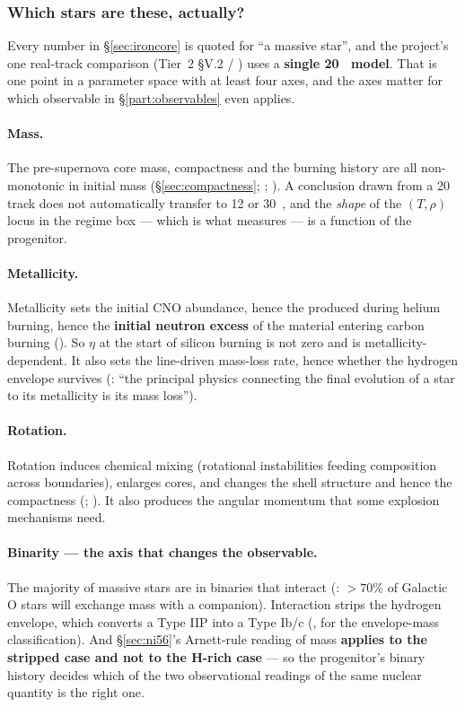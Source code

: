 \subsubsection{Which stars are these, actually?}
\label{sec:whichstars}

Every number in \S\ref{sec:ironcore} is quoted for ``a massive star'', and the
project's one real-track comparison (Tier~2 \S V.2 / ) uses
a \textbf{single 20~\Msun{} model}. That is one point in a parameter space with
at least four axes, and the axes matter for which observable in
\S\ref{part:observables} even applies.

\paragraph{Mass.} The pre-supernova core mass, compactness and the burning
history are all non-monotonic in initial mass (\S\ref{sec:compactness};
\citealt{ertl2016}; \citealt{sukhbold2018}). A conclusion drawn from a
20~\Msun{} track does not automatically transfer to 12 or 30~\Msun, and the
\emph{shape} of the $(T, \rho)$ locus in the regime box --- which is what
 measures --- is a function of the progenitor.

\paragraph{Metallicity.} Metallicity sets the initial CNO abundance, hence the
 produced during helium burning, hence the \textbf{initial neutron
excess} of the material entering carbon burning (\citealt{woosley2007}). So
$\eta$ at the start of silicon burning is not zero and is
metallicity-dependent. It also sets the line-driven mass-loss rate, hence
whether the hydrogen envelope survives (\citealt{heger2003}: ``the principal
physics connecting the final evolution of a star to its metallicity is its mass
loss'').

\paragraph{Rotation.} Rotation induces chemical mixing (rotational instabilities
feeding composition across boundaries), enlarges cores, and changes the shell
structure and hence the compactness (\citealt{heger2003}; \citealt{heger2000}).
It also produces the angular momentum that some explosion mechanisms need.

\paragraph{Binarity --- the axis that changes the observable.} The majority of
massive stars are in binaries that interact (\citealt{sana2012}: $> 70\%$ of
Galactic O stars will exchange mass with a companion). Interaction strips the
hydrogen envelope, which converts a Type IIP into a Type Ib/c
(\citealt[Table~1]{heger2003}, for the envelope-mass classification). And
\S\ref{sec:ni56}'s Arnett-rule reading of  mass \textbf{applies to
the stripped case and not to the H-rich case} --- so the progenitor's binary
history decides which of the two observational readings of the same nuclear
quantity is the right one.

